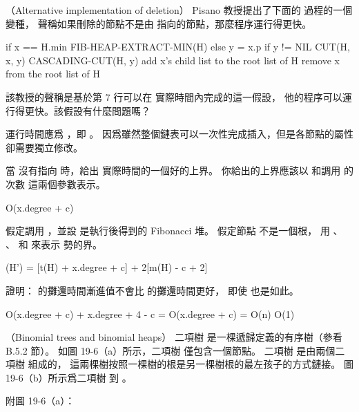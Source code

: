 \startsubject[
  title={Problems},
]

\startPROBLEM
（Alternative implementation of deletion）
Pisano 教授提出了下面的  過程的一個變種，
聲稱如果刪除的節點不是由  指向的節點，那麼程序運行得更快。

\startCLRS
if x == H.min
	FIB-HEAP-EXTRACT-MIN(H)
else
	y = x.p
	if y != NIL
		CUT(H, x, y)
		CASCADING-CUT(H, y)
	add x's child list to the root list of H
	remove x from the root list of H
\stopCLRS

\startigBase[a]\startitem
該教授的聲稱是基於第 7 行可以在  實際時間內完成的這一假設，
他的程序可以運行得更快。該假設有什麼問題嗎？
\stopitem\stopigBase

\startANSWER
運行時間應爲 ，即 。
因爲雖然整個鏈表可以一次性完成插入，但是各節點的屬性  卻需要獨立修改。
\stopANSWER

\startigBase[continue]\startitem
當  沒有指向  時，給出  實際時間的一個好的上界。
你給出的上界應該以  和調用  的次數  這兩個參數表示。
\stopitem\stopigBase

\startANSWER
\startformula
O(x.degree + c)
\stopformula
\stopANSWER

\startigBase[continue]\startitem
假定調用 ，並設  是執行後得到的 Fibonacci 堆。
假定節點  不是一個根，
用 、 、  和  來表示  勢的界。
\stopitem\stopigBase

\startANSWER
\startformula
\Phi(H') = [t(H) + x.degree + c] + 2[m(H) - c + 2]
\stopformula
\stopANSWER

\startigBase[continue]\startitem
證明：  的攤還時間漸進值不會比  的攤還時間更好，
即使  也是如此。
\stopitem\stopigBase

\startANSWER
\startformula
O(x.degree + c) + x.degree + 4 - c = O(x.degree + c) = O(\lg n) \gt O(1)
\stopformula
\stopANSWER

\stopPROBLEM

\startPROBLEM
（Binomial trees and binomial heaps）
二項樹  是一棵遞歸定義的有序樹（參看 B.5.2 節）。
如圖 19-6（a）所示，二項樹  僅包含一個節點。
二項樹  是由兩個二項樹  組成的，
這兩棵樹按照一棵樹的根是另一棵樹根的最左孩子的方式鏈接。
圖 19-6（b）所示爲二項樹  到 。

附圖 19-6（a）：

